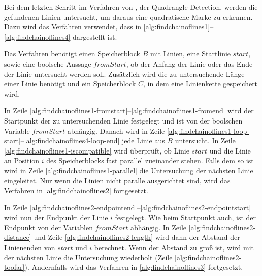 Bei dem letzten Schritt im Verfahren von \citeauthor{hirzer08}, der Quadrangle Detection, werden die gefundenen Linien
 untersucht, um daraus eine quadratische Marke zu erkennen. Dazu wird das Verfahren 
 verwendet, dass in \autoref{alg:findchainoflines1}--\autoref{alg:findchainoflines4} dargestellt ist.



Das Verfahren benötigt einen Speicherblock $B$ mit Linien, eine Startlinie $\mathit{start}$, sowie eine boolsche
 Aussage $\mathit{fromStart}$, ob der Anfang der Linie oder das Ende der Linie untersucht werden soll. Zusätzlich wird
 die zu untersuchende Länge einer Linie benötigt und ein Speicherblock $C$, in dem eine Linienkette gespeichert wird.

In Zeile \ref{alg:findchainoflines1-fromstart}--\ref{alg:findchainoflines1-fromend} wird der Startpunkt der zu
 untersuchenden Linie festgelegt und ist von der boolschen Variable $\mathit{fromStart}$ abhängig. Danach wird in Zeile
 \ref{alg:findchainoflines1-loop-start}--\ref{alg:findchainoflines4-loop-end} jede Linie aus $B$ untersucht. In Zeile
 \ref{alg:findchainoflines1-iscompatible} wird überprüft, ob Linie $\mathit{start}$ und die Linie an Position $i$ des
 Speicherblocks fast parallel zueinander stehen. Falls dem so ist wird in Zeile \ref{alg:findchainoflines1-parallel}
 die Untersuchung der nächsten Linie eingeleitet. Nur wenn die Linien nicht paralle ausgerichtet sind, wird das
 Verfahren in \autoref{alg:findchainoflines2} fortgesetzt.



In Zeile \ref{alg:findchainoflines2-endpointend}--\ref{alg:findchainoflines2-endpointstart} wird nun der Endpunkt der
 Linie $i$ festgelegt. Wie beim Startpunkt auch, ist der Endpunkt von der Variablen $\mathit{fromStart}$ abhängig. In
 Zeile \ref{alg:findchainoflines2-distance} und Zeile \ref{alg:findchainoflines2-length} wird dann der Abstand der
 Linienenden von $\mathit{start}$ und $i$ berechnet. Wenn der Abstand zu groß ist, wird mit der nächsten Linie die
 Untersuchung wiederholt (Zeile \ref{alg:findchainoflines2-toofar}). Andernfalls wird das Verfahren in
 \autoref{alg:findchainoflines3} fortgesetzt.



